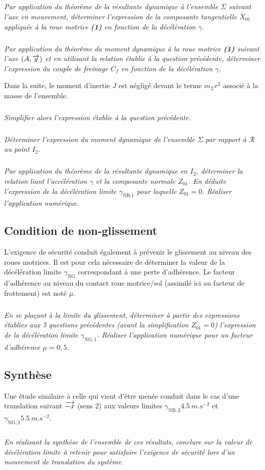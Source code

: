 \documentclass[10pt,fleqn]{article} %
\begin{document}
\begin{multicols}{2}
\subparagraph{}\textit{Par application du théorème de la résultante dynamique à l'ensemble $\Sigma$ suivant l'axe en mouvement,
déterminer l'expression de la composante tangentielle $X_{01}$ appliquée à la roue motrice \textbf{(1)} en fonction de la décélération $\gamma$.}

\subparagraph{}\textit{Par application du théorème du moment dynamique à la roue motrice \textbf{(1)} suivant l’axe $\left(A,\overrightarrow{y}\right)$ et en utilisant la relation établie à la question précédente, déterminer l’expression du couple de
freinage $C_f$ en fonction de la décélération $\gamma$.}


Dans la suite, le moment d’inertie $J$ est négligé devant le terme $m_{\Sigma}r^2$ associé à la masse de l’ensemble.

\subparagraph{}\textit{Simplifier alors l'expression établie à la question précédente.}
\subparagraph{}\textit{Déterminer l'expression du moment dynamique de l'ensemble $\Sigma$ par rapport à $\mathcal{R}$ au point $I_2$.}
\subparagraph{}\textit{Par application du théorème de la résultante dynamique en $I_2$, déterminer la relation liant l'accélération $\gamma$ et la composante normale $Z_{01}$. En déduite l'expression de la décélération limite $\gamma_{\text{NB,1}}$ pour laquelle $Z_{01}=0$. Réaliser l'application numérique.}


\subsection*{Condition de non-glissement}

L'exigence de sécurité conduit également à prévenir le glissement au niveau des roues motrices. Il est pour cela nécessaire de déterminer la valeur de la décélération limite $\gamma_{\text{NG}}$ correspondant à une perte d'adhérence. Le facteur d'adhérence au niveau du contact roue motrice/sol (assimilé ici au facteur de frottement) est noté $\mu$.

\subparagraph{}\textit{En se plaçant à la limite du glissement, déterminer à partir des expressions établies aux 5 questions précédentes (avant la simplification $Z_{01}=0$) l'expression de la décélération limite $\gamma_{\text{NG},1}$. Réaliser l'application numérique pour un facteur d'adhérence $\mu=0,5$.}

\subsection*{Synthèse}
Une étude similaire à celle qui vient d'être menée conduit dans le cas d'une translation suivant $\overrightarrow{-x}$ (sens 2) aux valeurs limites $\gamma_{\text{NB},2}\SI{4,5}{m.s^{-2}}$ et $\gamma_{\text{NG},2}\SI{5,5}{m.s^{-2}}$.

\subparagraph{}\textit{En réalisant la synthèse de l'ensemble de ces résultats, conclure sur la valeur de décélération limite à retenir pour satisfaire l'exigence de sécurité lors d'un mouvement de translation du système.}
\ifprof
\else
\end{multicols}
\fi
\end{document}
